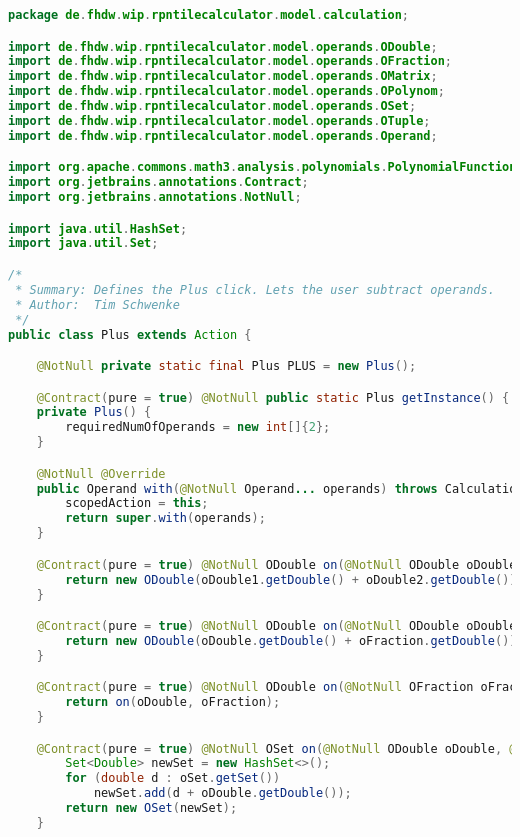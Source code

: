 \begin{lstlisting}[caption=Plus (Schwenke),label=list:Plus,language=Java]
package de.fhdw.wip.rpntilecalculator.model.calculation;

import de.fhdw.wip.rpntilecalculator.model.operands.ODouble;
import de.fhdw.wip.rpntilecalculator.model.operands.OFraction;
import de.fhdw.wip.rpntilecalculator.model.operands.OMatrix;
import de.fhdw.wip.rpntilecalculator.model.operands.OPolynom;
import de.fhdw.wip.rpntilecalculator.model.operands.OSet;
import de.fhdw.wip.rpntilecalculator.model.operands.OTuple;
import de.fhdw.wip.rpntilecalculator.model.operands.Operand;

import org.apache.commons.math3.analysis.polynomials.PolynomialFunction;
import org.jetbrains.annotations.Contract;
import org.jetbrains.annotations.NotNull;

import java.util.HashSet;
import java.util.Set;

/*
 * Summary: Defines the Plus click. Lets the user subtract operands.
 * Author:  Tim Schwenke
 */
public class Plus extends Action {

    @NotNull private static final Plus PLUS = new Plus();

    @Contract(pure = true) @NotNull public static Plus getInstance() { return PLUS; }
    private Plus() {
        requiredNumOfOperands = new int[]{2};
    }

    @NotNull @Override
    public Operand with(@NotNull Operand... operands) throws CalculationException {
        scopedAction = this;
        return super.with(operands);
    }

    @Contract(pure = true) @NotNull ODouble on(@NotNull ODouble oDouble1, @NotNull ODouble oDouble2) {
        return new ODouble(oDouble1.getDouble() + oDouble2.getDouble());
    }

    @Contract(pure = true) @NotNull ODouble on(@NotNull ODouble oDouble, @NotNull OFraction oFraction) {
        return new ODouble(oDouble.getDouble() + oFraction.getDouble());
    }

    @Contract(pure = true) @NotNull ODouble on(@NotNull OFraction oFraction, @NotNull ODouble oDouble) {
        return on(oDouble, oFraction);
    }

    @Contract(pure = true) @NotNull OSet on(@NotNull ODouble oDouble, @NotNull OSet oSet) {
        Set<Double> newSet = new HashSet<>();
        for (double d : oSet.getSet())
            newSet.add(d + oDouble.getDouble());
        return new OSet(newSet);
    }


\end{lstlisting}
